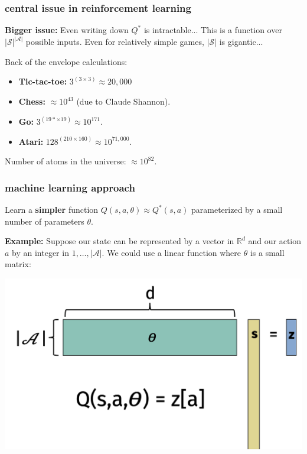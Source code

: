 \documentclass[handout,compress]{beamer}
\newcommand{\R}{\mathbb{R}}
\begin{document}
\begin{frame}
	\frametitle{central issue in reinforcement learning}
	\textbf{Bigger issue:} Even writing down $Q^*$ is intractable... This is a function over \alert{$|\mathcal{S}|^{|\mathcal{A}|}$} possible inputs. Even for relatively simple games, $|\mathcal{S}|$ is gigantic...
	
	Back of the envelope calculations:
	\begin{itemize}
		\item \textbf{Tic-tac-toe:} $3^{(3\times 3)} \approx 20,000$
		\item \textbf{Chess:} $\approx 10^{43}$ (due to Claude Shannon).
		\item \textbf{Go:} $3^{(19*\times19)} \approx 10^{171}$.
		\item \textbf{Atari:} $128^{(210\times 160)} \approx 10^{71,000}$.
	\end{itemize}
Number of atoms in the universe: $\approx 10^{82}$.
\end{frame}

\begin{frame}
	\frametitle{machine learning approach}
	Learn a \textbf{simpler} function $Q(s,a,{\theta}) \approx Q^*(s,a)$ parameterized by a small number of parameters ${\theta}$.  
	
	\textbf{Example:} Suppose our state can be represented by a vector in $\R^d$ and our action $a$ by an integer in $1,\ldots, |\mathcal{A}|$. We could use a linear function where $\theta$ is a small matrix:
	\begin{center}
		\includegraphics[width=.6\textwidth]{linear_example.png}
	\end{center}
\end{frame}
\end{document}
